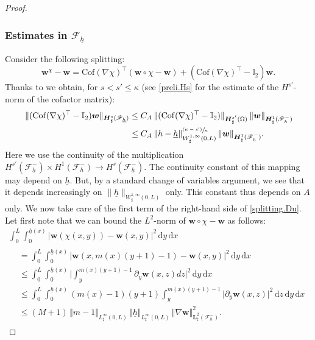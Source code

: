 \documentclass[11pt]{article}
\let\mathcal\mathscr
\newcommand{\psfrac}[2]{\sfrac{(#1)}{#2}}
\theoremstyle{remark}
\theoremstyle{definition}
\newcommand{\norme}[1]{\,\Vert #1\Vert}
\newcommand{\dd}{\,\mathrm{d}}
\newcommand{\wg}{\boldsymbol{w}}
\newcommand{\BS}[1]{\boldsymbol{#1}}
\let\CM\Omega
\newcommand{\hb}{{\underline{h}}}
\newcommand{\Cof}{\mathrm{Cof}}
\begin{document}
\begin{proof}
\subsubsection*{Estimates in $\mathcal{F}_{\hb}$}
Consider the following splitting:
\begin{equation}\label{splitting.Du}
\wg^\chi - \wg = \Cof(\nabla\chi)^{\top}(\wg\circ\chi - \wg) +(\Cof(\nabla\chi)^{\top}-\mathbb I_2)\wg.
\end{equation}
Thanks to \cite[Prop.\,B.1]{Grubsolo} we obtain, for $s<s'\leq \kappa$ (see \eqref{preli.Hs} for the estimate of the $H^{s'}$-norm of the cofactor matrix):
\[
\begin{aligned}
\norme{(\Cof(\nabla\chi)^{\top}-\mathbb I_2)\wg}_{ \BS{H}^{s}_{\sharp}(\mathcal{F}_{\hb})}&\leq C_{A} \norme{(\Cof(\nabla\chi)^{\top}-\mathbb I_2)}_{ \BS{H}^{s'}_{\sharp}(\CM)}\norme{\wg}_{\BS{H}^{1}_{\sharp}(\mathcal{F}^{-}_{h})}\\
&\leq C_A \norme{h-\hb}_{W^{1,\infty}_{\sharp}(0,L)}^{\psfrac{\kappa-s'}{\kappa}}\norme{\wg}_{\BS{H}^{1}_{\sharp}(\mathcal{F}^{-}_{h})}.
\end{aligned}
\]
Here we use the continuity of the
multiplication
$H^{s'}(\mathcal F^{-}_{\hb}) \times H^{1}(\mathcal F^{-}_{h}) \to
H^{s}(\mathcal F^{-}_{\hb})$. The continuity constant of this mapping
may depend on $\hb$. But, by a standard change of variables argument, we see that it depends increasingly on $\|\hb\|_{W^{1,\infty}_{\sharp}(0,L)}$ only. This constant thus depends on $A$ only.
We now take care of the first term of the right-hand side of \eqref{splitting.Du}.
Let first note that we can bound the $L^2$-norm of $\wg \circ \chi - \wg$ as follows:
\begin{multline*}
\int_{0}^{L}\int_{0}^{\hb(x)}\vert\wg(\chi(x,y)) - \wg(x,y)\vert^{2}\dd y\dd x
\\
\begin{aligned}
& =\int_{0}^{L}\int_{0}^{\hb(x)}\vert \wg(x,m(x)(y+1)-1)-\wg(x,y)\vert^{2}\dd y\dd x\\
&\leq \int_{0}^{L}\int_{0}^{\hb(x)}\biggl\vert \int_{y}^{m(x)(y+1)-1}\partial_y\wg(x,z)dz\biggr\vert^{2}\dd y\dd x\\
&\leq \int_{0}^{L}\int_{0}^{\hb(x)}(m(x)-1)(y+1)\int_{y}^{m(x)(y+1)-1}\vert \partial_y\wg(x,z)\vert^{2}\dd z\dd y\dd x\\
&\leq (M+1)\norme{m-1}_{L^{\infty}_{\sharp}(0,L)}\norme{\hb}_{L^{\infty}_{\sharp}(0,L)}\norme{\nabla\wg}_{\BS{L}^{2}_{\sharp}(\mathcal{F}^{-}_{h})}^{2}.
\end{aligned}
\end{multline*}

\end{proof}
\end{document}
